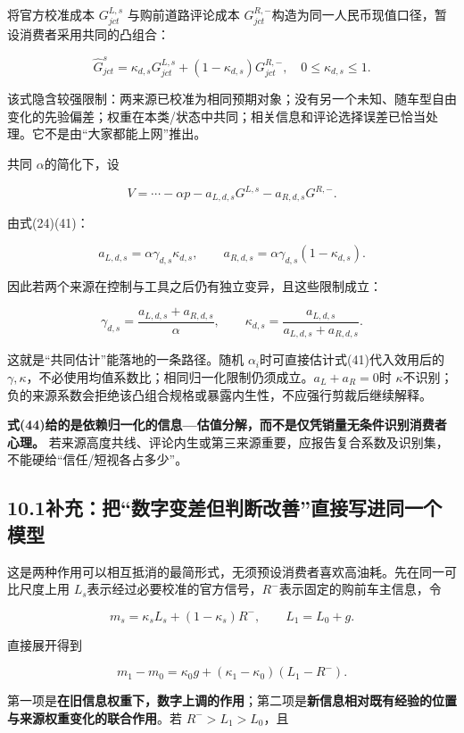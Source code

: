 \documentclass[
  11pt,
]{article}
\begin{document}
将官方校准成本 \(G_{jct}^{L,s}\) 与购前道路评论成本
\(G_{jct}^{R,-}\)构造为同一人民币现值口径，暂设消费者采用共同的凸组合：

\[
\widehat G_{jct}^{s}
=\kappa_{d,s}G_{jct}^{L,s}
+(1-\kappa_{d,s})G_{jct}^{R,-},
\quad0\leq\kappa_{d,s}\leq1.
\tag{41}
\]

该式隐含较强限制：两来源已校准为相同预期对象；没有另一个未知、随车型自由变化的先验偏差；权重在本类/状态中共同；相关信息和评论选择误差已恰当处理。它不是由``大家都能上网''推出。

共同 \(\alpha\)的简化下，设

\[
V=\cdots-\alpha p-a_{L,d,s}G^{L,s}-a_{R,d,s}G^{R,-}.
\tag{42}
\]

由式(24)(41)：

\[
a_{L,d,s}=\alpha\gamma_{d,s}\kappa_{d,s},\qquad
a_{R,d,s}=\alpha\gamma_{d,s}(1-\kappa_{d,s}).
\tag{43}
\]

因此若两个来源在控制与工具之后仍有独立变异，且这些限制成立：

\[
\boxed{\gamma_{d,s}=\frac{a_{L,d,s}+a_{R,d,s}}{\alpha},\qquad
\kappa_{d,s}=\frac{a_{L,d,s}}{a_{L,d,s}+a_{R,d,s}}.}
\tag{44}
\]

这就是``共同估计''能落地的一条路径。随机
\(\alpha_i\)时可直接估计式(41)代入效用后的
\(\gamma,\kappa\)，不必使用均值系数比；相同归一化限制仍须成立。\(a_L+a_R=0\)时
\(\kappa\)不识别；负的来源系数会拒绝该凸组合规格或暴露内生性，不应强行剪裁后继续解释。

\textbf{式(44)给的是依赖归一化的信息---估值分解，而不是仅凭销量无条件识别消费者心理。}
若来源高度共线、评论内生或第三来源重要，应报告复合系数及识别集，不能硬给``信任/短视各占多少''。

\subsection{10.1补充：把``数字变差但判断改善''直接写进同一个模型}\label{ux8865ux5145ux628aux6570ux5b57ux53d8ux5deeux4f46ux5224ux65adux6539ux5584ux76f4ux63a5ux5199ux8fdbux540cux4e00ux4e2aux6a21ux578b}

这是两种作用可以相互抵消的最简形式，无须预设消费者喜欢高油耗。先在同一可比尺度上用
\(L_s\)表示经过必要校准的官方信号，\(R^-\)表示固定的购前车主信息，令

\[
m_s=\kappa_s L_s+(1-\kappa_s)R^-,\qquad L_1=L_0+g.
\]

直接展开得到

\[
\boxed{m_1-m_0=\kappa_0g+(\kappa_1-\kappa_0)(L_1-R^-).}
\tag{44a}
\]

第一项是\textbf{在旧信息权重下，数字上调的作用}；第二项是\textbf{新信息相对既有经验的位置与来源权重变化的联合作用}。若
\(R^->L_1>L_0\)，且
\end{document}
